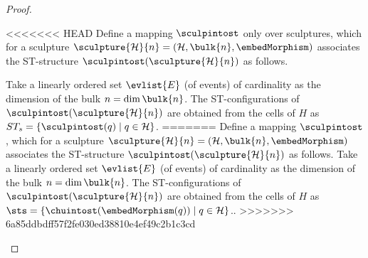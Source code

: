 \begin{proof}
    \begin{definition}
        \label{def:sculptures-to-ST}
<<<<<<< HEAD
        Define a mapping $\sculpintost$ only over sculptures, which for a sculpture $\sculpture{\mathcal{H}}{n}=(\mathcal{H},\bulk{n},\embedMorphism)$ associates the ST-structure $\sculpintost(\sculpture{\mathcal{H}}{n})$ as follows.

        Take a linearly ordered set $\evlist{E}$ (of events) of cardinality as the dimension of the bulk $n=\dim\bulk{n}$. The ST-configurations of $\sculpintost(\sculpture{\mathcal{H}}{n})$ are obtained from the cells of $H$ as $ST_{s}=\{\sculpintost(q) \mid q\in \mathcal{H}\}$.
=======
        Define a mapping $\sculpintost$, which for a sculpture $\sculpture{\mathcal{H}}{n}=(\mathcal{H},\bulk{n},\embedMorphism)$ associates the ST-structure $\sculpintost(\sculpture{\mathcal{H}}{n})$ as follows. Take a linearly ordered set $\evlist{E}$ (of events) of cardinality as the dimension of the bulk $n=\dim\bulk{n}$. The ST-configurations of $\sculpintost(\sculpture{\mathcal{H}}{n})$ are obtained from the cells of $H$ as $\sts=\{\chuintost(\embedMorphism(q)) \mid q\in \mathcal{H}\}$..
>>>>>>> 6a85ddbdff57f2fe030ed38810e4ef49c2b1c3cd


 
    
    \end{definition}
    


\end{proof}
